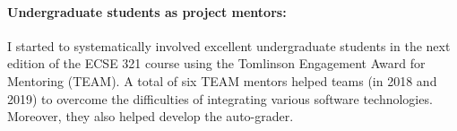 


\paragraph{Undergraduate students as project mentors:}
I started to systematically involved excellent undergraduate students in the next edition of the ECSE 321 course using the Tomlinson Engagement Award for Mentoring (TEAM). A total of six TEAM mentors helped teams (in 2018 and 2019) to overcome the difficulties of integrating various software technologies. Moreover, they also helped develop the auto-grader.  %

